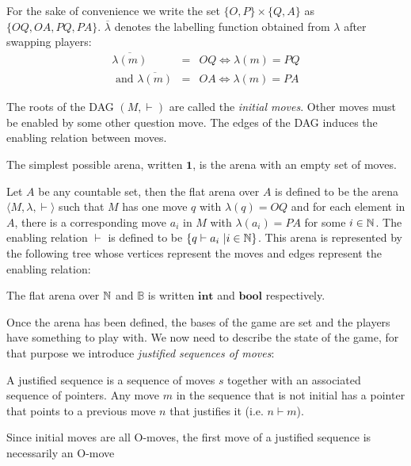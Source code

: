 For the sake of convenience we write the set $\{O,P\} \times
\{Q,A\}$ as $\{OQ,OA,PQ,PA\}$. $\overline{\lambda}$ denotes the
labelling function obtained from $\lambda$ after swapping players:
\begin{eqnarray*}
\overline{\lambda(m)} &=& OQ \iff \lambda(m) = PQ \\
\mbox{ and } \overline{\lambda(m)} &=& OA \iff \lambda(m) = PA
\end{eqnarray*}

The roots of the DAG $(M,\vdash)$ are called the \emph{initial moves}.
Other moves must be enabled by some other question move. The edges of the DAG induces the enabling relation between moves.

The simplest possible arena, written $\mathbf{1}$, is the arena with an empty set of moves.

\begin{exmp}
\label{exmp:flatarena}

 Let $A$ be any countable set, then the flat arena over $A$
is defined to be the arena $\langle M, \lambda, \vdash \rangle$ such
that $M$ has one move $q$ with $\lambda(q) = OQ$ and for each
element in $A$, there is a corresponding move $a_i$ in $M$ with
$\lambda(a_i) = PA$ for some $i \in \mathbb{N}$. The enabling relation
$\vdash$ is defined to be $\{ q \vdash a_i \ | i \in \mathbb{N} \}$.
This arena is represented by the following tree whose vertices represent the moves and edges represent the enabling relation:
\begin{center}
    {      \TR{\ldots} }
\end{center}
The flat arena over $\mathbb{N}$ and $\mathbb{B}$ is written
$\mathbf{int}$ and  $\mathbf{bool}$ respectively.
\end{exmp}

Once the arena has been defined, the bases of the game are set and the players have something to play with.
We now need to describe the state of the game, for that purpose
we introduce \emph{justified sequences of moves}:
\begin{dfn}
A justified sequence is a sequence of moves $s$ together with an
associated sequence of pointers. Any move $m$ in the sequence that
is not initial has a pointer that points to a previous move $n$ that
justifies it (i.e. $n \vdash m$).
\end{dfn}
Since initial moves are all O-moves, the first move of a justified
sequence is necessarily an O-move

